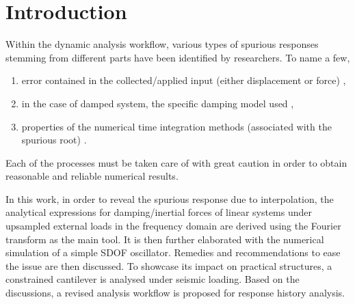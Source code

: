 \section{Introduction}
Within the dynamic analysis workflow, various types of spurious responses stemming from different parts have been identified by researchers. To name a few,
\begin{enumerate}
\item error contained in the collected/applied input (either displacement or force) \citep{Shing1987},
\item in the case of damped system, the specific damping model used \citep{Chopra2015},
\item properties of the numerical time integration methods (associated with the spurious root) \citep{Hulbert1994}.
\end{enumerate}
Each of the processes must be taken care of with great caution in order to obtain reasonable and reliable numerical results.

In this work, in order to reveal the spurious response due to interpolation, the analytical expressions for damping/inertial forces of linear systems under upsampled external loads in the frequency domain are derived using the Fourier transform as the main tool. It is then further elaborated with the numerical simulation of a simple SDOF oscillator. Remedies and recommendations to ease the issue are then discussed. To showcase its impact on practical structures, a constrained cantilever is analysed under seismic loading. Based on the discussions, a revised analysis workflow is proposed for response history analysis.